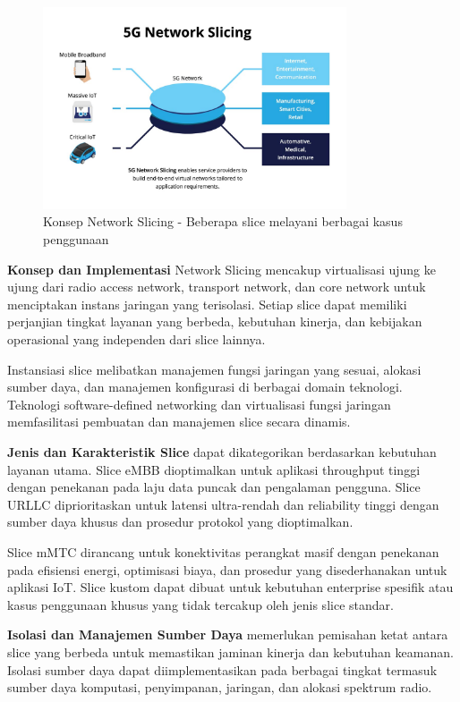 \begin{figure}[htbp]
    \centering
    \includegraphics[width=0.8\textwidth]{assets/pics/bab3_9.png}
    \caption{Konsep Network Slicing - Beberapa slice melayani berbagai kasus penggunaan}
    \label{fig:network_slicing_concept}
\end{figure}

\textbf{Konsep dan Implementasi} Network Slicing mencakup virtualisasi ujung ke ujung dari radio access network, transport network, dan core network untuk menciptakan instans jaringan yang terisolasi. Setiap slice dapat memiliki perjanjian tingkat layanan yang berbeda, kebutuhan kinerja, dan kebijakan operasional yang independen dari slice lainnya.

Instansiasi slice melibatkan manajemen fungsi jaringan yang sesuai, alokasi sumber daya, dan manajemen konfigurasi di berbagai domain teknologi. Teknologi software-defined networking dan virtualisasi fungsi jaringan memfasilitasi pembuatan dan manajemen slice secara dinamis.

\textbf{Jenis dan Karakteristik Slice} dapat dikategorikan berdasarkan kebutuhan layanan utama. Slice eMBB dioptimalkan untuk aplikasi throughput tinggi dengan penekanan pada laju data puncak dan pengalaman pengguna. Slice URLLC diprioritaskan untuk latensi ultra-rendah dan reliability tinggi dengan sumber daya khusus dan prosedur protokol yang dioptimalkan.

Slice mMTC dirancang untuk konektivitas perangkat masif dengan penekanan pada efisiensi energi, optimisasi biaya, dan prosedur yang disederhanakan untuk aplikasi IoT. Slice kustom dapat dibuat untuk kebutuhan enterprise spesifik atau kasus penggunaan khusus yang tidak tercakup oleh jenis slice standar.

\textbf{Isolasi dan Manajemen Sumber Daya} memerlukan pemisahan ketat antara slice yang berbeda untuk memastikan jaminan kinerja dan kebutuhan keamanan. Isolasi sumber daya dapat diimplementasikan pada berbagai tingkat termasuk sumber daya komputasi, penyimpanan, jaringan, dan alokasi spektrum radio.

